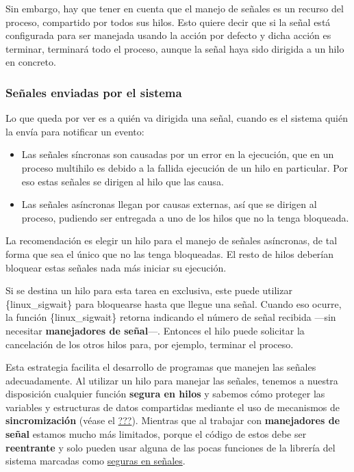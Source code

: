 Sin embargo, hay que tener en cuenta que el manejo de señales es un
recurso del proceso, compartido por todos sus hilos. Esto quiere decir
que si la señal está configurada para ser manejada usando la acción por
defecto y dicha acción es terminar, terminará todo el proceso, aunque la
señal haya sido dirigida a un hilo en concreto.

\subsubsection{Señales enviadas por el
sistema}\label{_seuxf1ales_enviadas_por_el_sistema}

Lo que queda por ver es a quién va dirigida una señal, cuando es el
sistema quién la envía para notificar un evento:

\begin{itemize}
\item
  Las señales síncronas son causadas por un error en la ejecución, que
  en un proceso multihilo es debido a la fallida ejecución de un hilo en
  particular. Por eso estas señales se dirigen al hilo que las causa.
\item
  Las señales asíncronas llegan por causas externas, así que se dirigen
  al proceso, pudiendo ser entregada a uno de los hilos que no la tenga
  bloqueada.
\end{itemize}

La recomendación es elegir un hilo para el manejo de señales asíncronas,
de tal forma que sea el único que no las tenga bloqueadas. El resto de
hilos deberían bloquear estas señales nada más iniciar su ejecución.

Si se destina un hilo para esta tarea en exclusiva, este puede utilizar
\{linux\_sigwait\} para bloquearse hasta que llegue una señal. Cuando
eso ocurre, la función \{linux\_sigwait\} retorna indicando el número de
señal recibida ---sin necesitar \textbf{manejadores de señal}---.
Entonces el hilo puede solicitar la cancelación de los otros hilos para,
por ejemplo, terminar el proceso.

Esta estrategia facilita el desarrollo de programas que manejen las
señales adecuadamente. Al utilizar un hilo para manejar las señales,
tenemos a nuestra disposición cualquier función \textbf{segura en hilos}
y sabemos cómo proteger las variables y estructuras de datos compartidas
mediante el uso de mecanismos de \textbf{sincromización} (véase el
\hyperref[sincronizaciuxf3n]{???}). Mientras que al trabajar con
\textbf{manejadores de señal} estamos mucho más limitados, porque el
código de estos debe ser \textbf{reentrante} y solo pueden usar alguna
de las pocas funciones de la librería del sistema marcadas como
\href{https://man7.org/linux/man-pages/man7/signal-safety.7.html}{seguras
en señales}.
